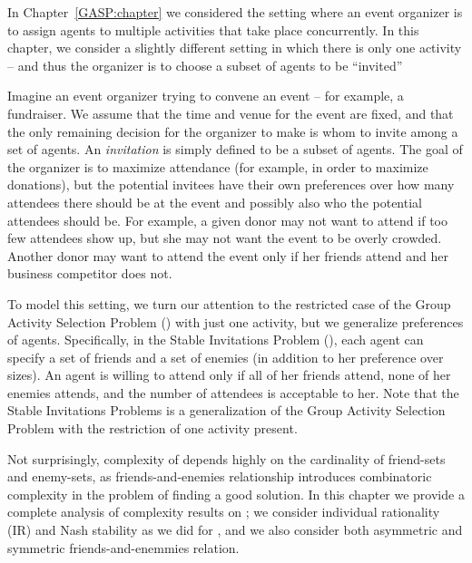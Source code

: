 \label{SIP:chapter}

In Chapter~\ref{GASP:chapter} we considered the setting where an event organizer is to assign agents to multiple activities that take place concurrently. In this chapter, we consider a slightly different setting in which there is only one activity -- and thus the organizer is to choose a subset of agents to be ``invited''

Imagine an event organizer trying to convene an event -- for example,
a fundraiser. We assume that the time and venue for the event are fixed,
and that the only remaining decision for the organizer to make is whom
to invite among a set of agents.
An \emph{invitation} is simply defined to be a subset of agents.
The goal of the organizer is to maximize attendance (for example, 
in order to maximize donations), but the potential invitees have 
their own preferences over how many attendees there should be at the event 
and possibly also who the potential attendees should be.
For example, a given donor may not want to attend if too few attendees 
show up, but she may not want the event to be overly crowded. 
Another donor may want to attend the event only
if her friends attend and her business competitor does not.

To model this setting, we turn our attention to the restricted case of the Group Activity Selection Problem (\GASP) with just one activity, but we generalize preferences of agents. 
Specifically, in the Stable Invitations Problem (\SIP), each agent 
can specify a set of friends and a set of enemies (in addition to her preference over sizes).
An agent is willing to attend only if all of her friends attend, none of her enemies attends, and 
the number of attendees is acceptable to her. 
Note that the Stable Invitations Problems is a generalization of the Group Activity Selection Problem with the restriction of one activity present. 

Not surprisingly, complexity of \SIPs depends highly on the cardinality of friend-sets and enemy-sets, as friends-and-enemies relationship introduces combinatoric complexity in the problem of finding a good solution. 
In this chapter we provide a complete analysis of complexity results on \SIPs; we consider individual rationality (IR) and Nash stability as we did for \GASP, and we also consider both asymmetric and symmetric friends-and-enemmies relation. 

